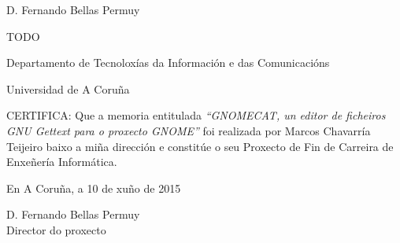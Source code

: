 %
%

\begin{center}
	\begin{minipage}[t][6cm][l]{.8\textwidth}
		\begin{center}
			D. {\sc Fernando Bellas Permuy}

			TODO

			Departamento de Tecnoloxías da Información e das Comunicacións

			Universidad de A Coruña
		\end{center}
	\end{minipage}
\end{center}

CERTIFICA:
Que a memoria entitulada {\it ``GNOMECAT, un editor de ficheiros GNU Gettext para o proxecto GNOME''} foi realizada por {\sc Marcos Chavarría Teijeiro} baixo a miña dirección e constitúe o seu Proxecto de Fin de Carreira de Enxeñería Informática.

\vspace{5cm}

En A Coruña, a 10 de xuño de 2015

\vspace{3cm}

\begin{center}
	\begin{minipage}[t][4cm][l]{.5\textwidth}
	D. {\sc Fernando Bellas Permuy}
	\\
	Director do proxecto
	\end{minipage}
\end{center}
